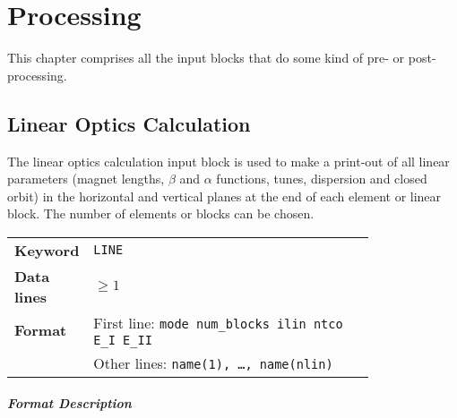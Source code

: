 
\chapter{Processing} \label{Proc}

This chapter comprises all the input blocks that do some kind of pre- or post-processing.

\section{Linear Optics Calculation} \label{LinOpt}

The linear optics calculation input block is used to make a print-out of all linear parameters (magnet lengths, $\beta$ and $\alpha$ functions, tunes, dispersion and closed orbit) in the horizontal and vertical planes at the end of each element or linear block.
The number of elements or blocks can be chosen.

\bigskip
\begin{tabular}{@{}lp{0.8\linewidth}}
    \textbf{Keyword}    & \texttt{LINE} \\
    \textbf{Data lines} & $\geq 1$ \\
    \textbf{Format}     & First line: \texttt{mode num\_blocks ilin ntco E\_I E\_II} \\
                        & Other lines: \texttt{name(1), \dots , name(nlin)}
\end{tabular}

\paragraph{Format Description}~

